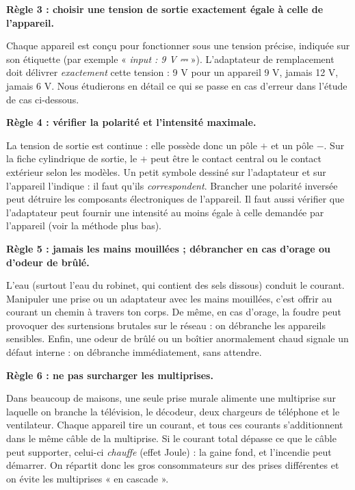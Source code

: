 \documentclass[11pt]{article}
\newcommand{\cle}[1]{{\popxbold\color{popdark}#1}}
\begin{document}
\textbf{Règle 3 : choisir une tension de sortie exactement égale à celle de l'appareil.}\par
Chaque appareil est conçu pour fonctionner sous une tension précise, indiquée sur son étiquette (par exemple « \emph{input : 9 V ⎓} »). L'adaptateur de remplacement doit délivrer \emph{exactement} cette tension : 9 V pour un appareil 9 V, jamais 12 V, jamais 6 V. Nous étudierons en détail ce qui se passe en cas d'erreur dans l'étude de cas ci-dessous.

\textbf{Règle 4 : vérifier la polarité et l'intensité maximale.}\par
La tension de sortie est continue : elle possède donc un pôle $+$ et un pôle $-$. Sur la fiche cylindrique de sortie, le $+$ peut être le contact central ou le contact extérieur selon les modèles. Un petit symbole dessiné sur l'adaptateur et sur l'appareil l'indique : il faut qu'ils \emph{correspondent}. Brancher une polarité inversée peut détruire les composants électroniques de l'appareil. Il faut aussi vérifier que l'adaptateur peut fournir une intensité au moins égale à celle demandée par l'appareil (voir la méthode plus bas).

\textbf{Règle 5 : jamais les mains mouillées ; débrancher en cas d'orage ou d'odeur de brûlé.}\par
L'eau (surtout l'eau du robinet, qui contient des sels dissous) conduit le courant. Manipuler une prise ou un adaptateur avec les mains mouillées, c'est offrir au courant un chemin à travers ton corps. De même, en cas d'orage, la foudre peut provoquer des \cle{surtensions} brutales sur le réseau : on débranche les appareils sensibles. Enfin, une odeur de brûlé ou un boîtier anormalement chaud signale un défaut interne : on débranche immédiatement, sans attendre.

\textbf{Règle 6 : ne pas surcharger les multiprises.}\par
Dans beaucoup de maisons, une seule prise murale alimente une multiprise sur laquelle on branche la télévision, le décodeur, deux chargeurs de téléphone et le ventilateur. Chaque appareil tire un courant, et tous ces courants s'additionnent dans le même câble de la multiprise. Si le courant total dépasse ce que le câble peut supporter, celui-ci \emph{chauffe} (effet Joule) : la gaine fond, et l'incendie peut démarrer. On répartit donc les gros consommateurs sur des prises différentes et on évite les multiprises « en cascade ».
\end{document}
